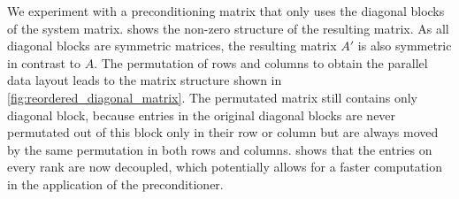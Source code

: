 % 

We experiment with a preconditioning matrix that only uses the diagonal blocks of the system matrix.  shows the non-zero structure of the resulting matrix.
As all diagonal blocks are symmetric matrices, the resulting matrix $A'$ is also symmetric in contrast to $A$. The permutation of rows and columns to obtain the parallel data layout leads to the matrix structure shown in \cref{fig:reordered_diagonal_matrix}. The permutated matrix still contains only diagonal block, because entries in the original diagonal blocks are never permutated out of this block only in their row or column but are always moved by the same permutation in both rows and columns.
 shows that the entries on every rank are now decoupled, which potentially allows for a faster computation in the application of the preconditioner.

